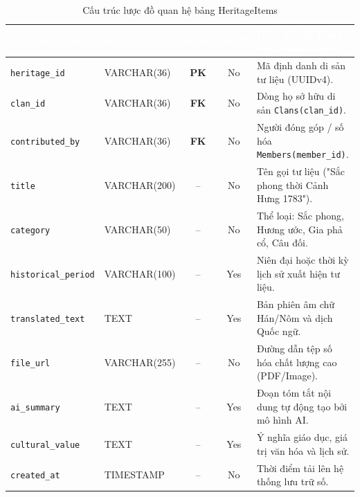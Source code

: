 \begin{table}[H]
    \centering
    \small
    \renewcommand{\arraystretch}{1.2}
    \begin{tabularx}{\textwidth}{p{3.2cm} p{2.6cm} c c X}
        \toprule
        \rowcolor{tableheader}\textcolor{white}{\textbf{Tên thuộc tính}} & \textcolor{white}{\textbf{Kiểu logic}} & \textcolor{white}{\textbf{Khóa}} & \textcolor{white}{\textbf{Null?}} & \textcolor{white}{\textbf{Diễn giải \& Ràng buộc tham chiếu}} \\
        \midrule
        \rowcolor{tablerowalt}
        \texttt{heritage\_id} & VARCHAR(36) & \textcolor{pkcolor}{\textbf{PK}} & No & Mã định danh di sản tư liệu (UUIDv4). \\
        \texttt{clan\_id} & VARCHAR(36) & \textcolor{fkcolor}{\textbf{FK}} & No & Dòng họ sở hữu di sản \texttt{Clans(clan\_id)}. \\
        \rowcolor{tablerowalt}
        \texttt{contributed\_by} & VARCHAR(36) & \textcolor{fkcolor}{\textbf{FK}} & No & Người đóng góp / số hóa \texttt{Members(member\_id)}. \\
        \texttt{title} & VARCHAR(200) & -- & No & Tên gọi tư liệu ("Sắc phong thời Cảnh Hưng 1783"). \\
        \rowcolor{tablerowalt}
        \texttt{category} & VARCHAR(50) & -- & No & Thể loại: Sắc phong, Hương ước, Gia phả cổ, Câu đối. \\
        \texttt{historical\_period} & VARCHAR(100) & -- & Yes & Niên đại hoặc thời kỳ lịch sử xuất hiện tư liệu. \\
        \rowcolor{tablerowalt}
        \texttt{translated\_text} & TEXT & -- & Yes & Bản phiên âm chữ Hán/Nôm và dịch Quốc ngữ. \\
        \texttt{file\_url} & VARCHAR(255) & -- & No & Đường dẫn tệp số hóa chất lượng cao (PDF/Image). \\
        \rowcolor{tablerowalt}
        \texttt{ai\_summary} & TEXT & -- & Yes & Đoạn tóm tắt nội dung tự động tạo bởi mô hình AI. \\
        \texttt{cultural\_value} & TEXT & -- & Yes & Ý nghĩa giáo dục, giá trị văn hóa và lịch sử. \\
        \rowcolor{tablerowalt}
        \texttt{created\_at} & TIMESTAMP & -- & No & Thời điểm tải lên hệ thống lưu trữ số. \\
        \bottomrule
    \end{tabularx}
    \caption{Cấu trúc lược đồ quan hệ bảng HeritageItems}
    \label{tab:schema_heritage_items}
\end{table}

